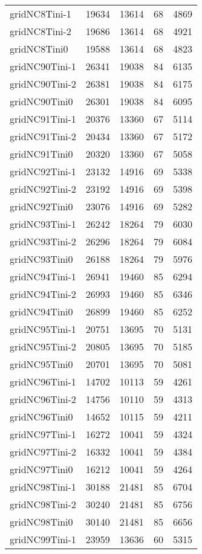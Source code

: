 \begin{longtable}{lrrrr}
gridNC8Tini-1 & 19634 & 13614 & 68 & 4869 \\
gridNC8Tini-2 & 19686 & 13614 & 68 & 4921 \\
gridNC8Tini0 & 19588 & 13614 & 68 & 4823 \\
gridNC90Tini-1 & 26341 & 19038 & 84 & 6135 \\
gridNC90Tini-2 & 26381 & 19038 & 84 & 6175 \\
gridNC90Tini0 & 26301 & 19038 & 84 & 6095 \\
gridNC91Tini-1 & 20376 & 13360 & 67 & 5114 \\
gridNC91Tini-2 & 20434 & 13360 & 67 & 5172 \\
gridNC91Tini0 & 20320 & 13360 & 67 & 5058 \\
gridNC92Tini-1 & 23132 & 14916 & 69 & 5338 \\
gridNC92Tini-2 & 23192 & 14916 & 69 & 5398 \\
gridNC92Tini0 & 23076 & 14916 & 69 & 5282 \\
gridNC93Tini-1 & 26242 & 18264 & 79 & 6030 \\
gridNC93Tini-2 & 26296 & 18264 & 79 & 6084 \\
gridNC93Tini0 & 26188 & 18264 & 79 & 5976 \\
gridNC94Tini-1 & 26941 & 19460 & 85 & 6294 \\
gridNC94Tini-2 & 26993 & 19460 & 85 & 6346 \\
gridNC94Tini0 & 26899 & 19460 & 85 & 6252 \\
gridNC95Tini-1 & 20751 & 13695 & 70 & 5131 \\
gridNC95Tini-2 & 20805 & 13695 & 70 & 5185 \\
gridNC95Tini0 & 20701 & 13695 & 70 & 5081 \\
gridNC96Tini-1 & 14702 & 10113 & 59 & 4261 \\
gridNC96Tini-2 & 14756 & 10110 & 59 & 4313 \\
gridNC96Tini0 & 14652 & 10115 & 59 & 4211 \\
gridNC97Tini-1 & 16272 & 10041 & 59 & 4324 \\
gridNC97Tini-2 & 16332 & 10041 & 59 & 4384 \\
gridNC97Tini0 & 16212 & 10041 & 59 & 4264 \\
gridNC98Tini-1 & 30188 & 21481 & 85 & 6704 \\
gridNC98Tini-2 & 30240 & 21481 & 85 & 6756 \\
gridNC98Tini0 & 30140 & 21481 & 85 & 6656 \\
gridNC99Tini-1 & 23959 & 13636 & 60 & 5315 \\

\end{longtable}
